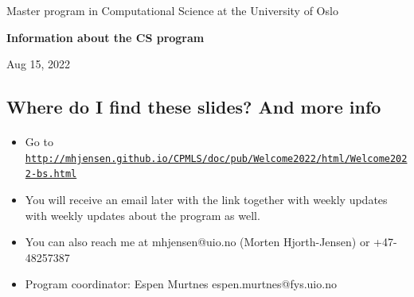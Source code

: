 \documentclass[%
oneside,                 %
final,                   %
10pt]{article}
\begin{document}

\newcommand{\exercisesection}[1]{\subsection*{#1}}






\thispagestyle{empty}

\begin{center}
{\LARGE\bf
\begin{spacing}{1.25}
Master program in Computational Science  at the University of Oslo
\end{spacing}
}
\end{center}


\begin{center}
{\bf Information about the CS program${}^{}$} \\ [0mm]
\end{center}

\begin{center}
\end{center}
    


\begin{center}
Aug 15, 2022
\end{center}

\vspace{1cm}


\subsection{Where do I find these slides? And more info}


\paragraph{}
\begin{itemize}
\item Go to \href{{http://mhjensen.github.io/CPMLS/doc/pub/Welcome2022/html/Welcome2022-bs.html}}{\nolinkurl{http://mhjensen.github.io/CPMLS/doc/pub/Welcome2022/html/Welcome2022-bs.html}}

\item You will receive an email later with the link together with weekly updates with weekly updates about the program as well.

\item You can also reach me at mhjensen@uio.no (Morten Hjorth-Jensen) or +47-48257387

\item Program coordinator: Espen Murtnes espen.murtnes@fys.uio.no
\end{itemize}
\end{document}
